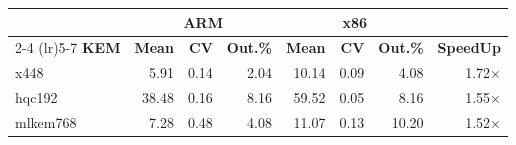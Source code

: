 \begin{table}[!ht]
\begin{tabular}{lrrr|rrr|r}
 \toprule
& \multicolumn{3}{c}{\bfseries ARM} & \multicolumn{3}{c}{\bfseries x86} &\\
\cmidrule(lr){2-4} \cmidrule(lr){5-7}
\textbf{KEM} & \textbf{Mean} & \textbf{CV} & \textbf{Out.\%} & \textbf{Mean} & \textbf{CV} & \textbf{Out.\%} & \textbf{SpeedUp}\\
\midrule
x448 & 5.91 & 0.14 & 2.04 & 10.14 & 0.09 & 4.08 & 1.72× \\
hqc192 & 38.48 & 0.16 & 8.16 & 59.52 & 0.05 & 8.16 & 1.55× \\
mlkem768 & 7.28 & 0.48 & 4.08 & 11.07 & 0.13 & 10.20 & 1.52× \\
\bottomrule
\end{tabular}
\end{table}
